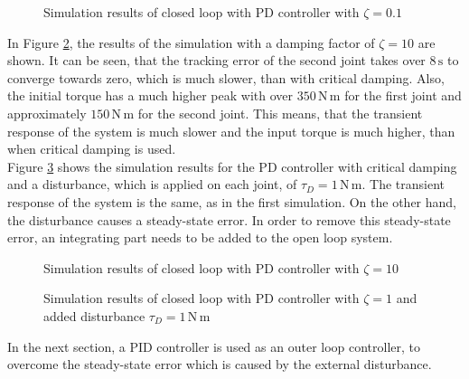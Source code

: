 \begin{figure}[H]
	\centering
	
	\caption{Simulation results of closed loop with PD controller with $\zeta = 0.1$}
	\label{fig:ch2_sim2}
\end{figure}
In Figure \ref{fig:ch2_sim3}, the results of the simulation with a damping factor of $\zeta = 10$ are shown. It can be seen, that the tracking error of the second joint takes over $8\,\mathrm{s}$ to converge towards zero, which is much slower, than with critical damping. Also, the initial torque has a much higher peak with over $350\,\mathrm{N\,m}$ for the first joint and approximately $150\,\mathrm{N\,m}$ for the second joint. This means, that the transient response of the system is much slower and the input torque is much higher, than when critical damping is used.\\
Figure \ref{fig:ch2_sim4} shows the simulation results for the PD controller with critical damping and a disturbance, which is applied on each joint, of $\tau_D = 1\,\mathrm{N\,m}$. The transient response of the system is the same, as in the first simulation. On the other hand, the disturbance causes a steady-state error. In order to remove this steady-state error, an integrating part needs to be added to the open loop system.
\begin{figure}[H]
	\centering
	
	\caption{Simulation results of closed loop with PD controller with $\zeta = 10$}
	\label{fig:ch2_sim3}
\end{figure}
\begin{figure}[H]
	\centering
	
	\caption{Simulation results of closed loop with PD controller with $\zeta = 1$ and added disturbance $\tau_D = 1\,\mathrm{N\,m}$}
	\label{fig:ch2_sim4}
\end{figure}
In the next section, a PID controller is used as an outer loop controller, to overcome the steady-state error which is caused by the external disturbance.
